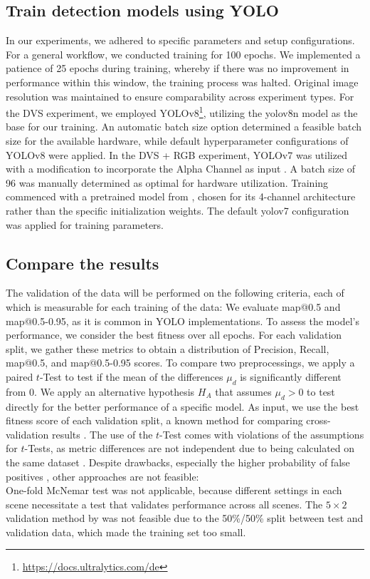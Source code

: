 \documentclass[sigchi,screen]{acmart}
\begin{document}
\subsection{Train detection models using YOLO}
\label{sec:training}
In our experiments, we adhered to specific parameters and setup configurations. For a general workflow, we conducted training for 100 epochs. We implemented a patience of 25 epochs during training, whereby if there was no improvement in performance within this window, the training process was halted. Original image resolution was maintained to ensure comparability across experiment types. For the DVS experiment, we employed YOLOv8\footnote{\url{https://docs.ultralytics.com/de}}, utilizing the yolov8n model as the base for our training. An automatic batch size option determined a feasible batch size for the available hardware, while default hyperparameter configurations of YOLOv8 were applied. In the DVS + RGB experiment, YOLOv7 \citep{wang2023yolov7} was utilized with a modification to incorporate the Alpha Channel as input \citep{scharf2023TEMP}. A batch size of 96 was manually determined as optimal for hardware utilization. Training commenced with a pretrained model from \citeauthor{scharf2023TEMP}, chosen for its 4-channel architecture rather than the specific initialization weights. The default yolov7 configuration was applied for training parameters.

\subsection{Compare the results}

The validation of the data will be performed on the following criteria, each of which is measurable for each training of the data: We evaluate map@0.5 and map@0.5-0.95, as it is common in YOLO implementations. To assess the model's performance, we consider the best fitness over all epochs. For each validation split, we gather these metrics to obtain a distribution of Precision, Recall, map@0.5, and map@0.5-0.95 scores. To compare two preprocessings, we apply a paired $t$-Test to test if the mean of the differences $\mu_d$ is significantly different from 0. We apply an alternative hypothesis $H_A$ that assumes $\mu_d > 0$ to test directly for the better performance of a specific model. As input, we use the best fitness score of each validation split, a known method for comparing cross-validation results \citep{dietrich1998approximate}. The use of the $t$-Test comes with violations of the assumptions for $t$-Tests, as metric differences are not independent due to being calculated on the same dataset \citep{raschka2018model}. Despite drawbacks, especially the higher probability of false positives \citep{dietrich1998approximate}, other approaches are not feasible: \\ One-fold McNemar test \citep{dietrich1998approximate, raschka2018model} was not applicable, because different settings in each scene necessitate a test that validates performance across all scenes. The $5\times2$ validation method by \cite{dietrich1998approximate} was not feasible due to the 50\%/50\% split between test and validation data, which made the training set too small.
\end{document}
